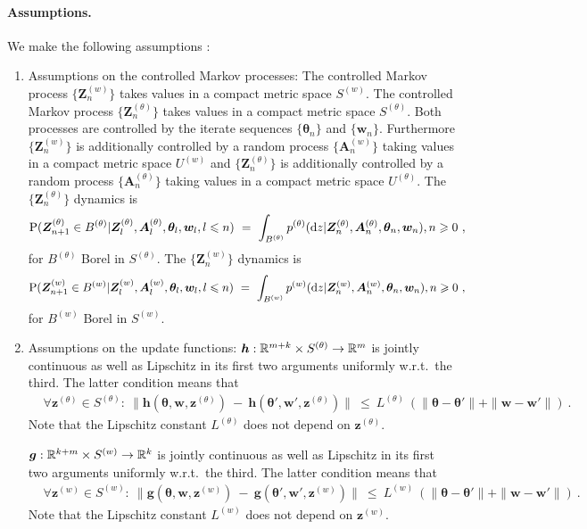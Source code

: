 \documentclass{article}
\newcommand\Bg{\bm{g}}
\newcommand\Bh{\bm{h}}
\newcommand\Bw{\bm{w}}
\newcommand\Bz{\bm{z}}
\newcommand\BA{\bm{A}}
\newcommand\BZ{\bm{Z}}
\newcommand\Bth{\bm{\theta}}
\renewcommand{\leq}{\leqslant}
\renewcommand{\geq}{\geqslant}
\begin{document}
\paragraph{Assumptions.}

We make the following assumptions \cite{Karmakar:17}:
\begin{enumerate}[label=\textbf{(A\arabic*)}]
\item Assumptions on the controlled Markov processes:
The controlled Markov process
$\{\BZ^{(w)}_n\}$ takes values in a compact metric space $S^{(w)}$.
The controlled Markov process
$\{\BZ^{(\theta)}_n\}$ takes values in a compact metric space $S^{(\theta)}$.
Both processes are controlled by the iterate sequences $\{\Bth_n\}$
and  $\{\Bw_n\}$. Furthermore $\{\BZ^{(w)}_n\}$ is additionally
controlled by a random process $\{\BA^{(w)}_n\}$ taking values in a
compact metric space $U^{(w)}$ and
$\{\BZ^{(\theta)}_n\}$ is additionally
controlled by a random process $\{\BA^{(\theta)}_n\}$
taking values in a
compact metric space $U^{(\theta)}$.
The $\{\BZ^{(\theta)}_n\}$ dynamics is
\begin{align}
\rP(\BZ^{(\theta)}_{n+1} \in B^{(\theta)} |\BZ^{(\theta)}_l,
\BA^{(\theta)}_l, \Bth_l, \Bw_l, l\leq n) \ &= \
\int_{B^{(\theta)}} p^{(\theta)}(\Rd z| \BZ^{(\theta)}_n,
\BA^{(\theta)}_n, \Bth_n, \Bw_n), n\geq 0 \ ,
\end{align}
for $B^{(\theta)}$ Borel in $S^{(\theta)}$.
The $\{\BZ^{(w)}_n\}$ dynamics is
\begin{align}
\rP(\BZ^{(w)}_{n+1} \in B^{(w)} |\BZ^{(w)}_l,
\BA^{(w)}_l, \Bth_l, \Bw_l, l\leq n) \ &= \
\int_{B^{(w)}} p^{(w)}(\Rd z| \BZ^{(w)}_n,
\BA^{(w)}_n, \Bth_n, \Bw_n), n\geq 0 \ ,
\end{align}
for $B^{(w)}$ Borel in $S^{(w)}$.

\item Assumptions on the update functions:
$\Bh :  \dR^{m+k} \times S^{(\theta)} \to \dR^m$ is
jointly continuous as well as Lipschitz in
its first two arguments uniformly w.r.t.\ the third.
The latter condition means that
\begin{align}
&\forall \Bz^{(\theta)} \in S^{(\theta)}: \
 \|\Bh(\Bth, \Bw, \Bz^{(\theta)}) \ - \ \Bh(\Bth', \Bw',
  \Bz^{(\theta)})\| \ \leq \ L^{(\theta)} \ (\|\Bth-\Bth'\| + \|\Bw -
  \Bw'\|) \ .
\end{align}
Note that the Lipschitz constant $L^{(\theta)}$ does not depend on
$\Bz^{(\theta)}$.

$\Bg :  \dR^{k+m} \times S^{(w)} \to \dR^k$ is
jointly continuous as well as Lipschitz in
its first two arguments uniformly w.r.t.\ the third.
The latter condition means that
\begin{align}
&\forall \Bz^{(w)} \in S^{(w)}: \
 \|\Bg(\Bth, \Bw, \Bz^{(w)}) \ - \ \Bg(\Bth', \Bw',
  \Bz^{(w)})\| \ \leq \ L^{(w)} \ (\|\Bth-\Bth'\| + \|\Bw -
  \Bw'\|) \ .
\end{align}
Note that the Lipschitz constant $L^{(w)}$ does not depend on
$\Bz^{(w)}$.



\end{enumerate}
\end{document}
